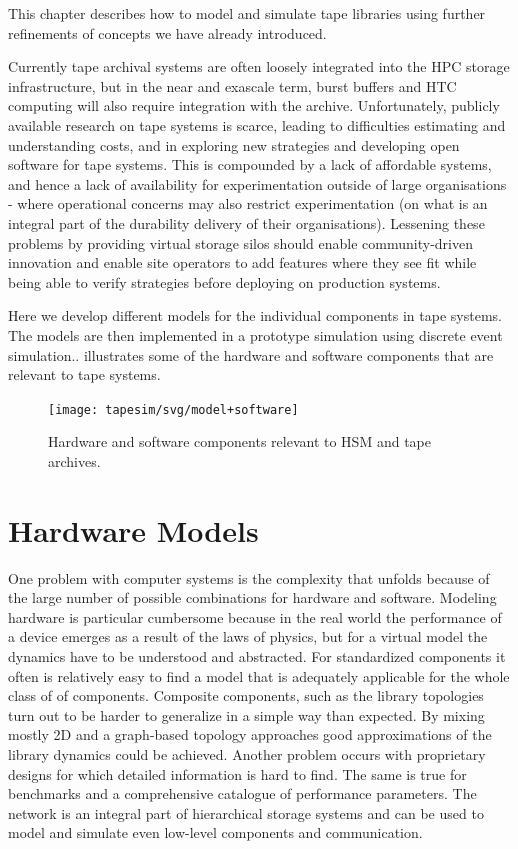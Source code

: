\documentclass{../../template/esiwace-report}
\begin{document}
This  chapter describes how to model and simulate tape libraries using further refinements of concepts we have already introduced.

Currently tape archival systems are often loosely integrated into the HPC storage infrastructure, but in the near and exascale term, burst buffers and HTC computing will also require integration with the archive.  
Unfortunately, publicly available research on tape systems is scarce, leading to difficulties estimating and understanding costs, and in exploring new strategies and developing open software for tape systems. This is compounded by a lack
of affordable systems, and hence a lack of availability for experimentation outside of large organisations - where operational concerns may also restrict experimentation (on what is an integral part of the durability delivery of their organisations).
Lessening these problems by providing virtual storage silos should enable community-driven innovation and enable site operators to add features where they see fit while being able to verify strategies before deploying on production systems.

Here we develop different models for the individual components in tape systems. The models are then implemented in a prototype simulation using discrete event simulation..
 illustrates some of the hardware and software components that are relevant to tape systems.


\begin{figure}
	\centering
	\texttt{[image: tapesim/svg/model+software]}
	\caption{Hardware and software components relevant to HSM and tape archives.}
	\label{fig:tapesim model and software}
\end{figure}


\section{Hardware Models}


One problem with computer systems is the complexity that unfolds because of the large number of possible combinations for hardware and software.
Modeling hardware is particular cumbersome because in the real world the performance of a device emerges as a result of the laws of physics, but for a virtual model the dynamics have to be understood and abstracted.
For standardized components it often is relatively easy to find a model that is adequately applicable for the whole class of of components.
Composite components, such as the library topologies turn out to be harder to generalize in a simple way than expected.
By mixing mostly 2D and a graph-based topology approaches good approximations of the library dynamics could be achieved.
Another problem occurs with proprietary designs for which detailed information is hard to find.
The same is true for benchmarks and a comprehensive catalogue of performance parameters.
The network is an integral part of hierarchical storage systems and can be used to model and simulate even low-level components and communication.
\end{document}
